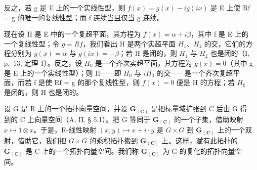 反之，若 g 是 E 上的一个实线性型，则 \(f(x) = g(x) - ig(ix)\) 是 E 上使 Rf = g 的唯一的复线性型；而 f 连续当且仅当 g 连续。

现在设 H 是 E 中的一个复超平面，其方程为 \(f(x) = \alpha + i\beta\)，其中 f 是 E 上的一个复线性型；令 \(g = Rf\)，我们看出 H 是两个实超平面 \(H_{1}\)、\(H_{2}\) 的交，它们的方程分别为 \(g(x) = \alpha\) 与 \(g(ix) = -\beta\)；若 H 是闭的，则 \(H_{1}\) 与 \(H_{2}\) 也是闭的（I, p.~13, 定理 1）。反之，设 \(H_{0}\) 是一个齐次实超平面，其方程为 \(g(x) = 0\)（其中 g 是 E 上的一个实线性型）；则 H——即 \(H_{0}\) 与 \(iH_{0}\) 的交——是一个齐次复超平面，而若 f 是使 Rf = g 的那个复线性型，则 \(f(x) = 0\) 便是 H 的方程；若 \(H_{0}\) 是闭的，则 H 也是闭的。

设 G 是 R 上的一个拓扑向量空间，并设 \(\mathbf{G}_{(\mathbf{C})}\) 是把标量域扩张到 C 后由 G 得到的 C 上向量空间（A, II, § 5.1）。把 G 等同于 \(\mathbf{G}_{(\mathbf{C})}\) 的一个子集，借助映射 \(x \mapsto 1 \otimes x\)。于是，R-线性映射 \((x, y) \mapsto x + i \cdot y\) 是 \(G \times G\) 到 \(\mathbf{G}_{(\mathbf{C})}\) 上的一个双射，借助它，我们把 \(G \times G\) 的乘积拓扑搬到 \(\mathbf{G}_{(\mathbf{C})}\) 上。这样，赋有此拓扑的 \(\mathbf{G}_{(\mathbf{C})}\) 是 C 上的一个拓扑向量空间。我们称 \(\mathbf{G}_{(\mathbf{C})}\) 为 G 的复化的拓扑向量空间。

